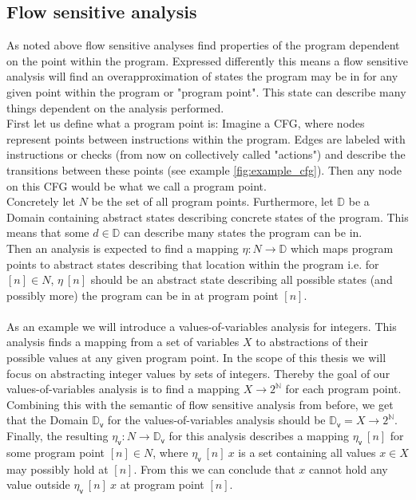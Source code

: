     \subsection{Flow sensitive analysis}

    As noted above flow sensitive analyses find properties of the program dependent on the point within the program. Expressed differently this means a flow sensitive analysis will find an overapproximation of states the program may be in for any given point within the program or "program point". This state can describe many things dependent on the analysis performed.\\
    First let us define what a program point is: Imagine a \ac{CFG}, where nodes represent points between instructions within the program. Edges are labeled with instructions or checks (from now on collectively called "actions") and describe the transitions between these points (see example \autoref{fig:example_cfg}). Then any node on this \ac{CFG} would be what we call a program point.\\
    Concretely let $N$ be the set of all program points. Furthermore, let $\mathbb{D}$ be a Domain containing abstract states describing concrete states of the program. This means that some $d \in \mathbb{D}$ can describe many states the program can be in.\\ 
    Then an analysis is expected to find a mapping $\eta: N \rightarrow \mathbb{D}$ which maps program points to abstract states describing that location within the program i.e. for $[n] \in N$, $\eta\ [n]$ should be an abstract state describing all possible states (and possibly more) the program can be in at program point $[n]$.\\
    \\
    As an example we will introduce a values-of-variables analysis for integers. This analysis finds a mapping from a set of variables $X$ to abstractions of their possible values at any given program point. In the scope of this thesis we will focus on abstracting integer values by sets of integers. Thereby the goal of our values-of-variables analysis is to find a mapping $X \rightarrow 2^\mathbb{N}$ for each program point.\\
    Combining this with the semantic of flow sensitive analysis from before, we get that the Domain $\mathbb{D}_\textsf{v}$ for the values-of-variables analysis should be $\mathbb{D}_\textsf{v} = X \rightarrow 2^\mathbb{N}$. Finally, the resulting $\eta_\textsf{v}: N \rightarrow \mathbb{D}_\textsf{v}$ for this analysis describes a mapping $\eta_\textsf{v}\ [n]$ for some program point $[n] \in N$, where $\eta_\textsf{v}\ [n]\ x$ is a set containing all values $x \in X$ may possibly hold at $[n]$. From this we can conclude that $x$ cannot hold any value outside $\eta_\textsf{v}\ [n]\ x$ at program point $[n]$.

